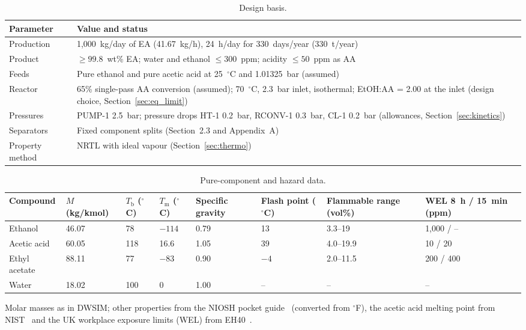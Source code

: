 \documentclass[10pt,a4paper]{article}
\newcommand{\hdrrow}{}
\newcommand{\tabnote}[1]{\par\vspace{2pt}\begin{minipage}{\textwidth}\justifying\footnotesize #1\end{minipage}}
\begin{document}
\begin{table}[H]
\centering
\caption{Design basis.}
\label{tab:design_basis}
\small
\begin{tabularx}{\textwidth}{|L{3.1cm}|Y|}
\hline
\hdrrow
\textbf{Parameter} & \textbf{Value and status} \\
\hline
Production & 1,000~kg/day of EA (41.67~kg/h), 24~h/day for 330~days/year (330~t/year) \\
\hline
Product & $\ge 99.8$~wt\% EA; water and ethanol $\le 300$~ppm; acidity $\le 50$~ppm as AA~\cite{ref3} \\
\hline
Feeds & Pure ethanol and pure acetic acid at 25~$^\circ$C and 1.01325~bar (assumed) \\
\hline
Reactor & 65\% single-pass AA conversion (assumed); 70~$^\circ$C, 2.3~bar inlet, isothermal; EtOH:AA = 2.00 at the inlet (design choice, Section~\ref{sec:eq_limit}) \\
\hline
Pressures & PUMP-1 2.5~bar; pressure drops HT-1 0.2~bar, RCONV-1 0.3~bar, CL-1 0.2~bar (allowances, Section~\ref{sec:kinetics}) \\
\hline
Separators & Fixed component splits (Section~2.3 and Appendix~A) \\
\hline
Property method & NRTL with ideal vapour (Section~\ref{sec:thermo}) \\
\hline
\end{tabularx}
\end{table}

\begin{table}[H]
\centering
\caption{Pure-component and hazard data.}
\label{tab:pure_comp}
\small
\begin{tabular}{|L{2.2cm}|R{1.6cm}|R{1.1cm}|R{1.1cm}|R{1.3cm}|R{1.5cm}|C{2.0cm}|C{2.2cm}|}
\hline
\hdrrow
\textbf{Compound} & \textbf{$M$ (kg/kmol)} & \textbf{$T_{\mathrm{b}}$ ($^\circ$C)} & \textbf{$T_{\mathrm{m}}$ ($^\circ$C)} & \textbf{Specific gravity} & \textbf{Flash point ($^\circ$C)} & \textbf{Flammable range (vol\%)} & \textbf{WEL 8~h / 15~min (ppm)} \\
\hline
Ethanol & 46.07 & 78 & $-114$ & 0.79 & 13 & 3.3--19 & 1,000 / -- \\
\hline
Acetic acid & 60.05 & 118 & 16.6 & 1.05 & 39 & 4.0--19.9 & 10 / 20 \\
\hline
Ethyl acetate & 88.11 & 77 & $-83$ & 0.90 & $-4$ & 2.0--11.5 & 200 / 400 \\
\hline
Water & 18.02 & 100 & 0 & 1.00 & -- & -- & -- \\
\hline
\end{tabular}
\tabnote{Molar masses as in DWSIM; other properties from the NIOSH pocket guide~\cite{ref4} (converted from $^\circ$F), the acetic acid melting point from NIST~\cite{ref5} and the UK workplace exposure limits (WEL) from EH40~\cite{ref6}.}
\end{table}
\end{document}
